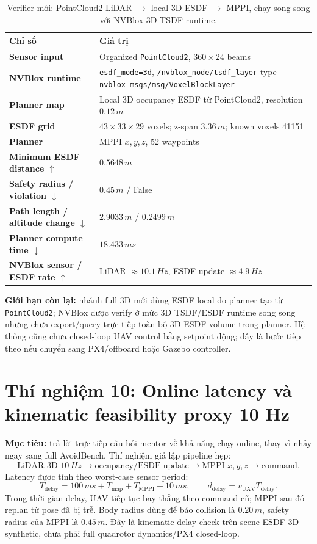 \documentclass[10pt,a4paper]{article}
\newcommand{\code}[1]{\texttt{#1}}
\begin{document}
\begin{table}[H]
\centering
\small
\caption{Verifier mới: PointCloud2 LiDAR \(\rightarrow\) local 3D ESDF \(\rightarrow\) MPPI, chạy song song với NVBlox 3D TSDF runtime.}
\begin{tabularx}{0.92\linewidth}{>{\bfseries}p{4.0cm} X}
\toprule
Chỉ số & Giá trị \\
\midrule
Sensor input & Organized \code{PointCloud2}, \(360 \times 24\) beams \\
NVBlox runtime & \code{esdf\_mode=3d}, \code{/nvblox\_node/tsdf\_layer} type \code{nvblox\_msgs/msg/VoxelBlockLayer} \\
Planner map & Local 3D occupancy ESDF từ PointCloud2, resolution \(0.12\,m\) \\
ESDF grid & \(43 \times 33 \times 29\) voxels; z-span \(3.36\,m\); known voxels 41151 \\
Planner & MPPI \(x,y,z\), 52 waypoints \\
Minimum ESDF distance $\uparrow$ & \(0.5648\,m\) \\
Safety radius / violation $\downarrow$ & \(0.45\,m\) / False \\
Path length / altitude change $\downarrow$ & \(2.9033\,m\) / \(0.2499\,m\) \\
Planner compute time $\downarrow$ & \(18.433\,ms\) \\
NVBlox sensor / ESDF rate $\uparrow$ & LiDAR \(\approx 10.1\,Hz\), ESDF update \(\approx 4.9\,Hz\) \\
\bottomrule
\end{tabularx}
\end{table}

\textbf{Giới hạn còn lại:} nhánh full 3D mới dùng ESDF local do planner tạo từ \code{PointCloud2}; NVBlox được verify ở mức 3D TSDF/ESDF runtime song song nhưng chưa export/query trực tiếp toàn bộ 3D ESDF volume trong planner. Hệ thống cũng chưa closed-loop UAV control bằng setpoint động; đây là bước tiếp theo nếu chuyển sang PX4/offboard hoặc Gazebo controller.

\section{Thí nghiệm 10: Online latency và kinematic feasibility proxy 10 Hz}

\textbf{Mục tiêu:} trả lời trực tiếp câu hỏi mentor về khả năng chạy online, thay vì nhảy ngay sang full AvoidBench. Thí nghiệm giả lập pipeline hẹp:
\[
\text{LiDAR 3D }10\,Hz \rightarrow \text{occupancy/ESDF update} \rightarrow \text{MPPI }x,y,z \rightarrow \text{command}.
\]
Latency được tính theo worst-case sensor period:
\[
T_{\mathrm{delay}} = 100\,ms + T_{\mathrm{map}} + T_{\mathrm{MPPI}} + 10\,ms,
\qquad
d_{\mathrm{delay}} = v_{\mathrm{UAV}}T_{\mathrm{delay}}.
\]
Trong thời gian delay, UAV tiếp tục bay thẳng theo command cũ; MPPI sau đó replan từ pose đã bị trễ. Body radius dùng để báo collision là \(0.20\,m\), safety radius của MPPI là \(0.45\,m\). Đây là kinematic delay check trên scene ESDF 3D synthetic, chưa phải full quadrotor dynamics/PX4 closed-loop.
\end{document}
